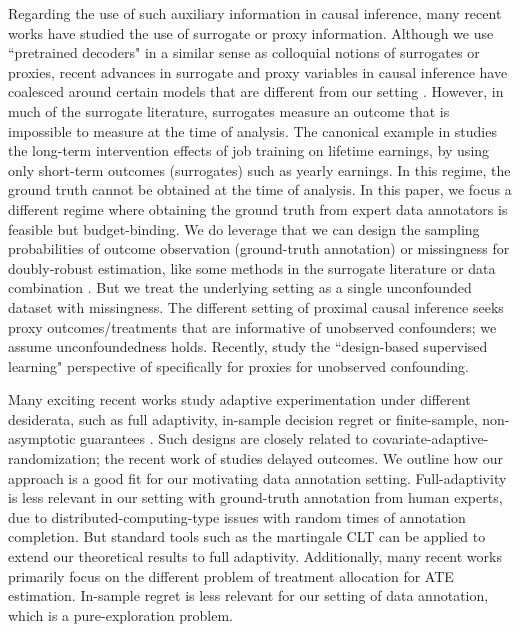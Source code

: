 Regarding the use of such auxiliary information in causal inference, many recent works have studied the use of surrogate or proxy information. Although we use ``pretrained decoders" in a similar sense as colloquial notions of surrogates or proxies, recent advances in surrogate and proxy variables in causal inference have coalesced around certain models that are different from our setting \citep{athey2019surrogate,kallus2024role,naoki2023dsl}. However, in much of the surrogate literature, surrogates measure an outcome that is impossible to measure at the time of analysis. The canonical example in \cite{athey2019surrogate} studies the long-term intervention effects of job training on lifetime earnings, by using only short-term outcomes (surrogates) such as yearly earnings. In this regime, the ground truth cannot be obtained at the time of analysis. In this paper, we focus a different regime where obtaining the ground truth from expert data annotators is feasible but budget-binding. 
We do leverage that we can design the sampling probabilities of outcome observation (ground-truth annotation) or missingness for doubly-robust estimation, like some methods in the surrogate literature or data combination \citep{yang2020combining,kallus2024role}. But we treat the underlying setting as a single unconfounded dataset with missingness. 
The different setting of proximal causal inference \citep{tchetgen2024introduction,cui2024semiparametric} seeks proxy outcomes/treatments that are informative of unobserved confounders; we assume unconfoundedness holds. Recently, \citep{chen2024proximal} study the ``design-based supervised learning" perspective of \citep{naoki2023dsl} specifically for proxies for unobserved confounding.



Many exciting recent works study adaptive experimentation under different desiderata, such as full adaptivity, in-sample decision regret or finite-sample, non-asymptotic guarantees \citep{gao2019batched,zhao2023adaptive,cook2024semiparametric}. Such designs are closely related to covariate-adaptive-randomization; the recent work of  \citep{shiusing} studies delayed outcomes. We outline how our approach is a good fit for our motivating data annotation setting. Full-adaptivity is less relevant in our setting with ground-truth annotation from human experts, due to distributed-computing-type issues with random times of annotation completion. But standard tools such as the martingale CLT can be applied to extend our theoretical results to full adaptivity. Additionally, many recent works primarily focus on the different problem of treatment allocation for ATE estimation. In-sample regret is less relevant for our setting of data annotation, which is a pure-exploration problem.